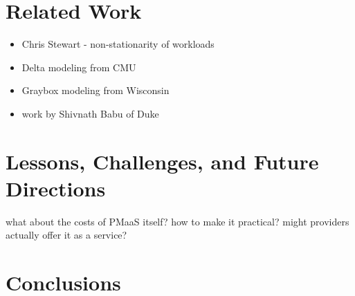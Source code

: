 \documentclass{acm_proc_article-sp}
\begin{document}
\section{Related Work}
\label{sec:related}

\begin{itemize}
   \item Chris Stewart - non-stationarity of workloads
   \item Delta modeling from CMU
   \item Graybox modeling from Wisconsin
   \item work by Shivnath Babu of Duke
\end{itemize}


\section{Lessons, Challenges, and Future Directions}
\label{sec:future}

what about the costs of PMaaS itself? how to make it practical? might providers actually offer it as a service?

\section{Conclusions}
\label{sec:conclus}



%

%
%

\balancecolumns
\end{document}

